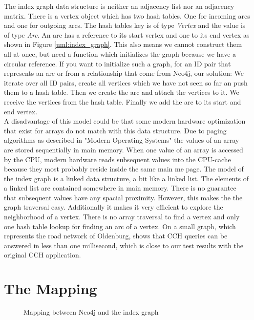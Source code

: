 The index graph data structure is neither an adjacency list nor an adjacency matrix.
There is a vertex object which has two hash tables.
One for incoming arcs and one for outgoing arcs.
The hash tables key is of type \textit{Vertex} and the value is of type \textit{Arc}.
An arc has a reference to its start vertex and one to its end vertex as shown in Figure \ref{uml:index_graph}.
This also means we cannot construct them all at once, but need a function which initializes the graph because we have a circular reference.
If you want to initialize such a graph, for an ID pair that represents an arc or from a relationship that come from Neo4j, our solution:
We iterate over all ID pairs, create all vertices which we have not seen so far an push them to a hash table.
Then we create the arc and attach the vertices to it.
We receive the vertices from the hash table.
Finally we add the arc to its start and end vertex.
\\
A disadvantage of this model could be that some modern hardware optimization that exist for arrays do not match with this data structure.
Due to paging algorithms as described in "Modern Operating Systems" \cite{andrew2015modern} the values of an array are stored sequentially in main memory.
When one value of an array is accessed by the CPU, modern hardware reads subsequent values into the CPU-cache because they most probably reside inside the same main me page.
The model of the index graph is a linked data structure, a bit like a linked list.
The elements of a linked list are contained somewhere in main memory.
There is no guarantee that subsequent values have any spacial proximity.
However, this makes the the graph traversal easy.
Additionally it makes it very efficient to explore the neighborhood of a vertex.
There is no array traversal to find a vertex and only one hash table lookup for finding an arc of a vertex.
On a small graph, which represents the road network of Oldenburg, shows that CCH queries can be answered in less than one millisecond, which is close to our test results with the original CCH application.

\section{The Mapping}\label{sec:mapping}
\begin{figure}
    \centering
    
    \caption{Mapping between Neo4j and the index graph}
    \label{fig:mapping}
\end{figure}

